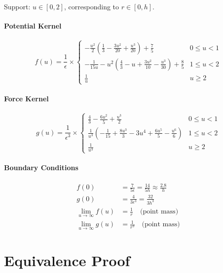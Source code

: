 \documentclass[12pt]{article}
\begin{document}
Support: $u \in [0, 2]$, corresponding to $r \in [0, h]$.

\subsection{Potential Kernel}
\begin{equation}
f(u) = \frac{1}{\epsilon} \times
\begin{cases}
-\frac{u^2}{2}\left(\frac{1}{3} - \frac{3u^2}{20} + \frac{u^3}{20}\right) + \frac{7}{5} & 0 \leq u < 1 \\[8pt]
-\frac{1}{15u} - u^2\left(\frac{4}{3} - u + \frac{3u^2}{10} - \frac{u^3}{30}\right) + \frac{8}{5} & 1 \leq u < 2 \\[8pt]
\frac{1}{u} & u \geq 2
\end{cases}
\end{equation}

\subsection{Force Kernel}
\begin{equation}
g(u) = \frac{1}{\epsilon^3} \times
\begin{cases}
\frac{4}{3} - \frac{6u^2}{5} + \frac{u^3}{2} & 0 \leq u < 1 \\[8pt]
\frac{1}{u^3}\left(-\frac{1}{15} + \frac{8u^3}{3} - 3u^4 + \frac{6u^5}{5} - \frac{u^6}{6}\right) & 1 \leq u < 2 \\[8pt]
\frac{1}{u^3} & u \geq 2
\end{cases}
\end{equation}

\subsection{Boundary Conditions}
\begin{align}
f(0) &= \frac{7}{5\epsilon} = \frac{14}{5h} \approx \frac{2.8}{h} \\
g(0) &= \frac{4}{3\epsilon^3} = \frac{32}{3h^3} \\
\lim_{u \to \infty} f(u) &= \frac{1}{r} \quad \text{(point mass)} \\
\lim_{u \to \infty} g(u) &= \frac{1}{r^3} \quad \text{(point mass)}
\end{align}

\part{Equivalence Proof}
\end{document}
